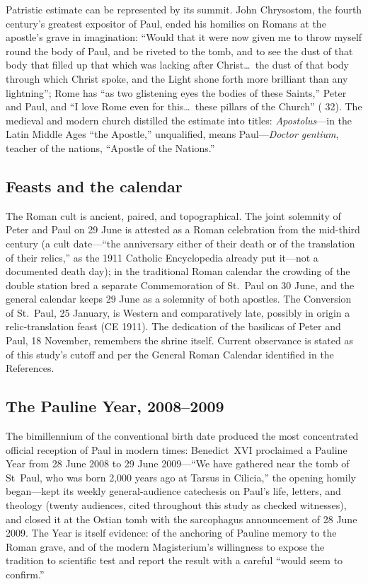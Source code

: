 Patristic estimate can be represented by its summit. John Chrysostom, the
fourth century's greatest expositor of Paul, ended his homilies on Romans
at the apostle's grave in imagination: ``Would that it were now given me
to throw myself round the body of Paul, and be riveted to the tomb, and
to see the dust of that body that filled up that which was lacking after
Christ\ldots\ the dust of that body through which Christ spoke, and the
Light shone forth more brilliant than any lightning''; Rome has ``as two
glistening eyes the bodies of these Saints,'' Peter and Paul, and ``I
love Rome even for this\ldots\ these pillars of the Church''
( 32). The medieval and modern church distilled
the estimate into titles: \textit{Apostolus}---in the Latin Middle Ages
``the Apostle,'' unqualified, means Paul---\textit{Doctor gentium},
teacher of the nations, ``Apostle of the Nations.''

\subsection{Feasts and the calendar}

The Roman cult is ancient, paired, and topographical. The joint solemnity
of Peter and Paul on 29 June is attested as a Roman celebration from the
mid-third century (a cult date---``the anniversary either of their death
or of the translation of their relics,'' as the 1911 Catholic
Encyclopedia already put it---not a documented death day); in the
traditional Roman calendar the crowding of the double station bred a
separate Commemoration of St.~Paul on 30 June, and the general calendar
keeps 29 June as a solemnity of both apostles. The Conversion of
St.~Paul, 25 January, is Western and comparatively late, possibly in
origin a relic-translation feast (CE 1911). The dedication of the
basilicas of Peter and Paul, 18 November, remembers the shrine itself.
Current observance is stated as of this study's cutoff and per the
General Roman Calendar identified in the References.

\subsection{The Pauline Year, 2008--2009}

The bimillennium of the conventional birth date produced the most
concentrated official reception of Paul in modern times: Benedict~XVI
proclaimed a Pauline Year from 28 June 2008 to 29 June 2009---``We have
gathered near the tomb of St~Paul, who was born 2,000 years ago at Tarsus
in Cilicia,'' the opening homily began---kept its weekly general-audience
catechesis on Paul's life, letters, and theology (twenty audiences, cited
throughout this study as checked witnesses), and closed it at the Ostian
tomb with the sarcophagus announcement of 28 June 2009. The Year is
itself evidence: of the anchoring of Pauline memory to the Roman grave,
and of the modern Magisterium's willingness to expose the tradition to
scientific test and report the result with a careful ``would seem to
confirm.''

